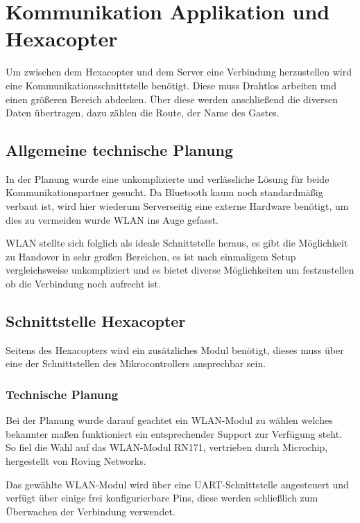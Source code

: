 \chapter{Kommunikation Applikation und Hexacopter}
\renewcommand{\kapitelautor}{Autor: Katharina Joksch, Lucas Ullrich}
Um zwischen dem Hexacopter und dem Server eine Verbindung herzustellen wird eine Kommunikationsschnittstelle benötigt. Diese muss Drahtlos arbeiten und einen größeren Bereich
abdecken. Über diese werden anschließend die diversen Daten übertragen, dazu zählen \zB die Route, \bzw der Name des Gastes.

\section{Allgemeine technische Planung}
In der Planung wurde eine unkomplizierte und verlässliche Lösung für beide Kommunikationspartner gesucht. Da Bluetooth kaum noch standardmäßig verbaut ist, wird hier wiederum
Serverseitig eine externe Hardware benötigt, um dies zu vermeiden wurde WLAN ins Auge gefasst.

WLAN stellte sich folglich als ideale Schnittstelle heraus,
es gibt die Möglichkeit zu Handover in sehr großen Bereichen, es ist nach einmaligem Setup vergleichsweise unkompliziert und es bietet diverse Möglichkeiten um festzustellen
ob die Verbindung noch aufrecht ist.

\section{Schnittstelle Hexacopter}
Seitens des Hexacopters wird ein zusätzliches Modul benötigt, dieses muss über eine der Schnittstellen des Mikrocontrollers ansprechbar sein.

  \subsection{Technische Planung}
  Bei der Planung wurde darauf geachtet ein WLAN-Modul zu wählen welches bekannter maßen funktioniert \bzw ein entsprechender Support zur Verfügung steht.
  So fiel die Wahl auf das WLAN-Modul RN171, vertrieben durch Microchip, hergestellt von Roving Networks.

  Das gewählte WLAN-Modul wird über eine UART-Schnittstelle angesteuert und verfügt über einige frei konfigurierbare Pins, diese werden schließlich zum Überwachen der
  Verbindung verwendet.

